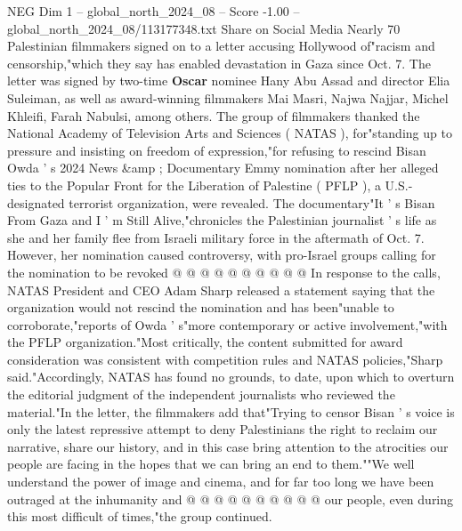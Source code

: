 \begin{textsample}{NEG Dim 1 – global\_north\_2024\_08 – Score -1.00 – global\_north\_2024\_08/113177348.txt}  \label{ex:f1_neg_377}
Share on Social Media Nearly 70 Palestinian filmmakers signed on to a letter accusing Hollywood of"racism and censorship,"which they say has enabled devastation in Gaza since Oct. 7.
The letter was signed by two-time \textbf{Oscar} nominee Hany Abu Assad and director Elia Suleiman, as well as award-winning filmmakers Mai Masri, Najwa Najjar, Michel Khleifi, Farah Nabulsi, among others.
The group of filmmakers thanked the National Academy of Television Arts and Sciences ( NATAS ), for"standing up to pressure and insisting on freedom of expression,"for refusing to rescind Bisan Owda ' s 2024 News \&amp ; Documentary Emmy nomination after her alleged ties to the Popular Front for the Liberation of Palestine ( PFLP ), a U.S.-designated terrorist organization, were revealed.
The documentary"It ' s Bisan From Gaza and I ' m Still Alive,"chronicles the Palestinian journalist ' s life as she and her family flee from Israeli military force in the aftermath of Oct. 7.
However, her nomination caused controversy, with pro-Israel groups calling for the nomination to be revoked @ @ @ @ @ @ @ @ @ @ In response to the calls, NATAS President and CEO Adam Sharp released a statement saying that the organization would not rescind the nomination and has been"unable to corroborate,"reports of Owda ' s"more contemporary or active involvement,"with the PFLP organization."Most critically, the content submitted for award consideration was consistent with competition rules and NATAS policies,"Sharp said."Accordingly, NATAS has found no grounds, to date, upon which to overturn the editorial judgment of the independent journalists who reviewed the material."In the letter, the filmmakers add that"Trying to censor Bisan ' s voice is only the latest repressive attempt to deny Palestinians the right to reclaim our narrative, share our history, and in this case bring attention to the atrocities our people are facing in the hopes that we can bring an end to them.""We well understand the power of image and cinema, and for far too long we have been outraged at the inhumanity and @ @ @ @ @ @ @ @ @ @ our people, even during this most difficult of times,"the group continued.

\end{textsample}
